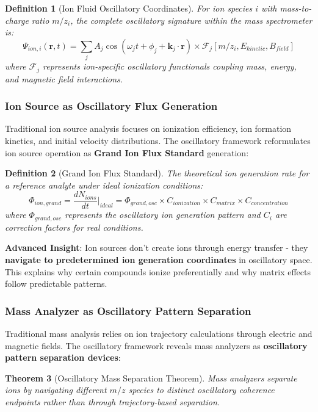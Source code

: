\documentclass[11pt,a4paper]{article}
\newtheorem{theorem}{Theorem}[section]
\newtheorem{definition}[theorem]{Definition}
\theoremstyle{remark}
\begin{document}
\begin{definition}[Ion Fluid Oscillatory Coordinates]
For ion species $i$ with mass-to-charge ratio $m/z_i$, the complete oscillatory signature within the mass spectrometer is:
$$\Psi_{ion,i}(\mathbf{r}, t) = \sum_j A_j \cos(\omega_j t + \phi_j + \mathbf{k}_j \cdot \mathbf{r}) \times \mathcal{F}_j[m/z_i, E_{kinetic}, B_{field}]$$
where $\mathcal{F}_j$ represents ion-specific oscillatory functionals coupling mass, energy, and magnetic field interactions.
\end{definition}

\subsubsection{Ion Source as Oscillatory Flux Generation}

Traditional ion source analysis focuses on ionization efficiency, ion formation kinetics, and initial velocity distributions. The oscillatory framework reformulates ion source operation as \textbf{Grand Ion Flux Standard} generation:

\begin{definition}[Grand Ion Flux Standard]
The theoretical ion generation rate for a reference analyte under ideal ionization conditions:
$$\Phi_{ion,grand} = \frac{dN_{ions}}{dt}\bigg|_{ideal} = \Phi_{grand,osc} \times C_{ionization} \times C_{matrix} \times C_{concentration}$$
where $\Phi_{grand,osc}$ represents the oscillatory ion generation pattern and $C_i$ are correction factors for real conditions.
\end{definition}

\textbf{Advanced Insight}: Ion sources don't create ions through energy transfer - they \textbf{navigate to predetermined ion generation coordinates} in oscillatory space. This explains why certain compounds ionize preferentially and why matrix effects follow predictable patterns.

\subsubsection{Mass Analyzer as Oscillatory Pattern Separation}

Traditional mass analysis relies on ion trajectory calculations through electric and magnetic fields. The oscillatory framework reveals mass analyzers as \textbf{oscillatory pattern separation devices}:

\begin{theorem}[Oscillatory Mass Separation Theorem]
Mass analyzers separate ions by navigating different $m/z$ species to distinct oscillatory coherence endpoints rather than through trajectory-based separation.
\end{theorem}
\end{document}
